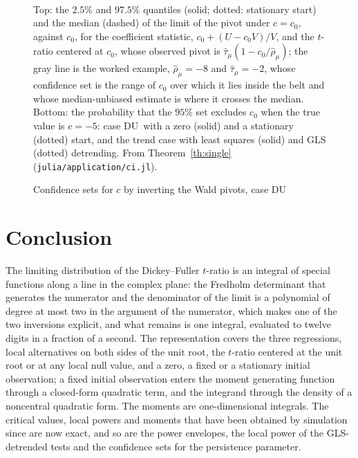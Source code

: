 \documentclass[ecta,nameyear,final]{econsocart}
\newcommand{\Fu}{\textsf{\upshape DU}}
\theoremstyle{plain}
\theoremstyle{definition}
\begin{document}
\begin{figure}[tbp]
\begin{center}
\\[0.4ex]
\end{center}
\caption{Confidence sets for $c$ by inverting the Wald pivots, case \Fu}
\label{fig:ci}
{\small Top: the $2.5\%$ and $97.5\%$ quantiles (solid; dotted: stationary start) and the median (dashed) of the limit of the pivot under $c=c_0$, against $c_0$, for the coefficient statistic, $c_0+(U-c_0V)/V$, and the $t$-ratio centered at $c_0$, whose observed pivot is $\hat\tau_\mu(1-c_0/\hat\rho_\mu)$; the gray line is the worked example, $\hat\rho_\mu=-8$ and $\hat\tau_\mu=-2$, whose confidence set is the range of $c_0$ over which it lies inside the belt and whose median-unbiased estimate is where it crosses the median.  Bottom: the probability that the $95\%$ set excludes $c_0$ when the true value is $c=-5$: case \Fu\ with a zero (solid) and a stationary (dotted) start, and the trend case with least squares (solid) and GLS (dotted) detrending.  From Theorem~\ref{th:single} (\texttt{julia/application/ci.jl}).}
\end{figure}

\section{Conclusion}
\label{sec:concl}

The limiting distribution of the Dickey--Fuller $t$-ratio is an integral of special functions along a line in the complex plane: the Fredholm determinant that generates the numerator and the denominator of the limit is a polynomial of degree at most two in the argument of the numerator, which makes one of the two inversions explicit, and what remains is one integral, evaluated to twelve digits in a fraction of a second.  The representation covers the three regressions, local alternatives on both sides of the unit root, the $t$-ratio centered at the unit root or at any local null value, and a zero, a fixed or a stationary initial observation; a fixed initial observation enters the moment generating function through a closed-form quadratic term, and the integrand through the density of a noncentral quadratic form.  The moments are one-dimensional integrals.  The critical values, local powers and moments that have been obtained by simulation since \cite{DickeyFuller1979} are now exact, and so are the power envelopes, the local power of the GLS-detrended tests and the confidence sets for the persistence parameter.
\end{document}
